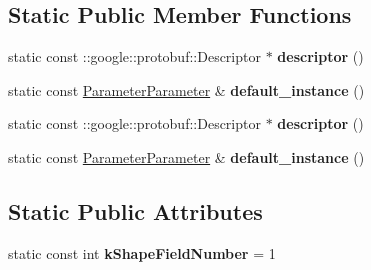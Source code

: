 \subsection*{Static Public Member Functions}
\begin{DoxyCompactItemize}
\item 
\mbox{\label{classcaffe_1_1_parameter_parameter_a5c73050470beb83397fa322143b32d2f}} 
static const \+::google\+::protobuf\+::\+Descriptor $\ast$ {\bfseries descriptor} ()
\item 
\mbox{\label{classcaffe_1_1_parameter_parameter_aa867e8b35d19fe92e3f6841d27478b48}} 
static const \mbox{\hyperlink{classcaffe_1_1_parameter_parameter}{Parameter\+Parameter}} \& {\bfseries default\+\_\+instance} ()
\item 
\mbox{\label{classcaffe_1_1_parameter_parameter_af1b55f21c5f0c7abed44adb69b2da983}} 
static const \+::google\+::protobuf\+::\+Descriptor $\ast$ {\bfseries descriptor} ()
\item 
\mbox{\label{classcaffe_1_1_parameter_parameter_a17e9a919d1d343899eccf8272b398a77}} 
static const \mbox{\hyperlink{classcaffe_1_1_parameter_parameter}{Parameter\+Parameter}} \& {\bfseries default\+\_\+instance} ()
\end{DoxyCompactItemize}
\subsection*{Static Public Attributes}
\begin{DoxyCompactItemize}
\item 
\mbox{\label{classcaffe_1_1_parameter_parameter_a95d87f1451100307bcf7521aeeb5b426}} 
static const int {\bfseries k\+Shape\+Field\+Number} = 1
\end{DoxyCompactItemize}
